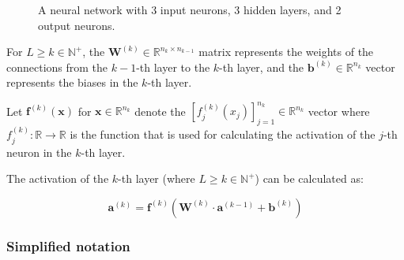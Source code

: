 \documentclass{article}
\begin{document}
\begin{figure}[!htb]
        \caption{%
          A neural network with 3 input neurons, 3 hidden layers, and 2 output
          neurons.
        }
      \end{figure}

      For $L \geq k \in \mathbb{N}^+$, the
      $\mathbf{W}^{(k)} \in \mathbb{R}^{n_{k} \times n_{k-1}}$ matrix represents
      the weights of the connections from the $k-1$-th layer to the $k$-th
      layer, and the $\mathbf{b}^{(k)} \in \mathbb{R}^{n_k}$ vector represents
      the biases in the $k$-th layer.

      Let $\mathbf{f}^{(k)} ( \mathbf{x} )$ for
      $\mathbf{x} \in \mathbb{R}^{n_k}$ denote the
      $\left[ f_j^{(k)} ( x_j ) \right]_{j=1}^{n_k} \in \mathbb{R}^{n_k}$ vector
      where $f_j^{(k)} : \mathbb{R} \rightarrow \mathbb{R}$ is the function
      that is used for calculating the activation of the $j$-th neuron in the
      $k$-th layer.

      The activation of the $k$-th layer (where $L \geq k \in \mathbb{N}^+$)
      can be calculated as:

      \begin{equation}\label{eqactivation}
        \mathbf{a}^{(k)} =
          \mathbf{f}^{(k)} \left(
            \mathbf{W}^{(k)} \cdot \mathbf{a}^{(k-1)} + \mathbf{b}^{(k)}
          \right)
      \end{equation}

      \subsubsection{Simplified notation}\label{simplifiednotation}
\end{document}
